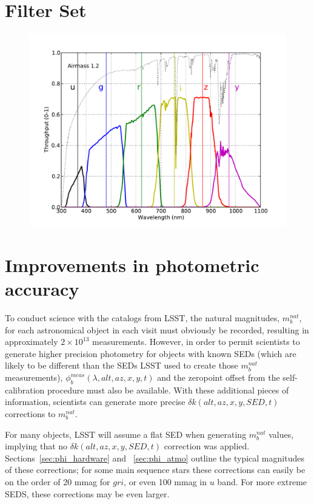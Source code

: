 \documentclass[12pt,preprint]{aastex}
\begin{document}




\appendix

\newpage
\section{Filter Set}

\begin{figure}[h!]
\includegraphics[width=5in]{filters}
\end{figure}


\section{Improvements in photometric accuracy}
\label{sec:photo_better}

To conduct science with the catalogs from LSST, the natural
magnitudes, $m_b^{nat}$, for each astronomical object in each visit
must obviously be recorded, resulting in approximately
$2\times10^{13}$ measurements. However, in order to permit scientists
to generate higher precision photometry for objects with known SEDs
(which are likely to be different than the SEDs LSST used to create
those $m_b^{nat}$ measurements), $\phi_b^{meas}(\lambda,alt,az,x,y,t)$
and the zeropoint offset from the self-calibration procedure must also
be available. With these additional pieces of information, scientists
can generate more precise $\delta k(alt,az,x,y,SED,t)$ corrections to
$m_b^{nat}$.

For many objects, LSST will assume a flat SED when generating
$m_b^{nat}$ values, implying that no $\delta k(alt, az, x, y, SED, t)$
correction was applied. Sections~\ref{sec:phi_hardware} and
~\ref{sec:phi_atmo} outline the typical magnitudes of these corrections;
for some main sequence stars these corrections can easily be on the
order of 20 mmag for $gri$, or even 100 mmag in $u$ band. For more
extreme SEDS, these corrections may be even larger.
\end{document}
